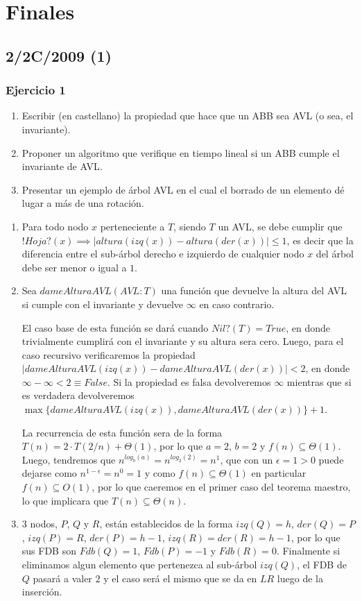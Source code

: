 \documentclass[10pt, a4paper]{report}
\begin{document}
\chapter{Finales}


\section{2/2C/2009 (1)}

\subsection*{Ejercicio 1}

\begin{enumerate}
 \item Escribir (en castellano) la propiedad que hace que un ABB sea AVL (o sea, el invariante).
 \item Proponer un algoritmo que verifique en tiempo lineal si un ABB cumple el invariante de AVL.
 \item Presentar un ejemplo de \'arbol AVL en el cual el borrado de un elemento dé lugar a más de una rotaci\'on.
\end{enumerate}

\begin{enumerate}
 \item Para todo nodo $x$ perteneciente a $T$, siendo $T$ un AVL, se debe cumplir que $!Hoja?(x) \implies |altura(izq(x))-altura(der(x))| \leq 1$, es decir que la diferencia entre el sub-\'arbol derecho e izquierdo de cualquier nodo $x$ del \'arbol debe ser menor o igual a $1$.
 \item Sea $dameAlturaAVL(AVL: T)$ una funci\'on que devuelve la altura del AVL si cumple con el invariante y devuelve $\infty$ en caso contrario. 
 
 El caso base de esta funci\'on se dar\'a cuando $Nil?(T) = True$, en donde trivialmente cumplir\'a con el invariante y su altura sera cero. Luego, para el caso recursivo verificaremos la propiedad $|dameAlturaAVL(izq(x))-dameAlturaAVL(der(x))| < 2$, en donde $\infty - \infty < 2 \equiv False$. Si la propiedad es falsa devolveremos $\infty$ mientras que si es verdadera devolveremos $\max\{dameAlturaAVL(izq(x)),dameAlturaAVL(der(x))\}+1$.
 
 La recurrencia de esta funci\'on sera de la forma $T(n) = 2\cdot T(2/n) + \Theta(1)$, por lo que $a=2$, $b=2$ y $f(n) \subseteq \Theta(1)$. Luego, tendremos que $n^{log_b(a)} = n^{log_2(2)} = n^1$, que con un $\epsilon = 1 > 0$ puede dejarse como $n^{1-\epsilon} = n^0 = 1$ y como $f(n) \subseteq \Theta(1)$ en particular $f(n) \subseteq O(1)$, por lo que caeremos en el primer caso del teorema maestro, lo que implicara que $T(n) \subseteq \Theta(n)$.
 
 \item $3$ nodos, $P$, $Q$ y $R$, est\'an establecidos de la forma $izq(Q) = h$, $der(Q) = P$, $izq(P) = R$, $der(P) = h-1$, $izq(R) = der(R) = h-1$, por lo que sus FDB son $Fdb(Q) = 1$, $Fdb(P) = -1$ y $Fdb(R) = 0$. Finalmente si eliminamos algun elemento que pertenezca al sub-\'arbol $izq(Q)$, el FDB de $Q$ pasar\'a a valer $2$ y el caso ser\'a el mismo que se da en $LR$ luego de la inserci\'on.
\end{enumerate}
\end{document}
